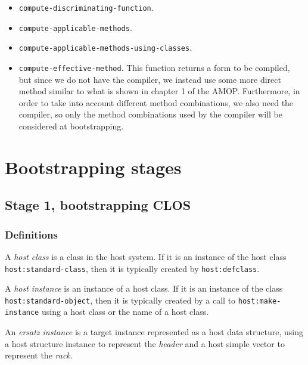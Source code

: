 \begin{itemize}
\item \texttt{compute-discriminating-function}.
\item \texttt{compute-applicable-methods}.
\item \texttt{compute-applicable-methods-using-classes}.
\item \texttt{compute-effective-method}.  This function returns a form
  to be compiled, but since we do not have the compiler, we instead
  use some more direct method similar to what is shown in chapter 1 of
  the AMOP.  Furthermore, in order to take into account different
  method combinations, we also need the compiler, so only the method
  combinations used by the compiler will be considered at
  bootstrapping.
\end{itemize}

\section{Bootstrapping stages}

\subsection{Stage 1, bootstrapping CLOS}

\subsubsection{Definitions}

\begin{definition}
A \emph{host class} is a class in the host system.  If it is an
instance of the host class \texttt{host:standard-class}, then
it is typically created by \texttt{host:defclass}.
\end{definition}

\begin{definition}
A \emph{host instance} is an instance of a host class.  If it is an
instance of the class \texttt{host:standard-object}, then it is
typically created by a call to \texttt{host:make-instance} using a
host class or the name of a host class.
\end{definition}

\begin{definition}
An \emph{ersatz instance} is a target instance represented as a host
data structure, using a host structure instance to represent the
\emph{header} and a host simple vector to represent the \emph{rack}.
\end{definition}


